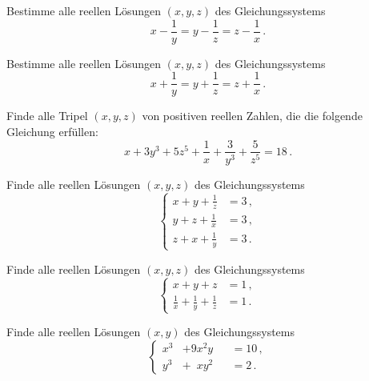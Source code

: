 \begin{aufgabe*}\label{aufgabe:520943}
	Bestimme alle reellen Lösungen $(x,y,z)$ des Gleichungssystems
	\begin{equation*}
		x-\frac 1y=y-\frac 1z=z-\frac 1x\,.
	\end{equation*}
\end{aufgabe*}
\begin{aufgabe*}\label{aufgabe:521043}
	Bestimme alle reellen Lösungen $(x,y,z)$ des Gleichungssystems
	\begin{equation*}
		x+\frac 1y=y+\frac 1z=z+\frac 1x\,.
	\end{equation*}
\end{aufgabe*}
\begin{aufgabe*}\label{aufgabe:380943}
	Finde alle Tripel $(x,y,z)$ von positiven reellen Zahlen, die die folgende Gleichung erfüllen:
	\begin{equation*}
		x+3y^3+5z^5+\frac1x+\frac{3}{y^3}+\frac{5}{z^5}=18\,.
	\end{equation*}
\end{aufgabe*}
\begin{aufgabe*}\label{aufgabe:451046}
	Finde alle reellen Lösungen $(x,y,z)$ des Gleichungssystems
	\begin{equation*}
		\left\{\begin{aligned}
			x+y+\frac 1z &= 3\,,\\
			y+z+\frac 1x &= 3\,,\\
			z+x+\frac 1y &= 3\,.
		\end{aligned}\right.
	\end{equation*}
\end{aufgabe*}
\begin{aufgabe*}\label{aufgabe:461041}
	Finde alle reellen Lösungen $(x,y,z)$ des Gleichungssystems
	\begin{equation*}
		\left\{\begin{aligned}
			x+y+z &= 1\,,\\
			\frac 1x+\frac 1y+\frac 1z &= 1\,.
		\end{aligned}\right.
	\end{equation*}
\end{aufgabe*}
\begin{aufgabe*}\label{aufgabe:541241}
	Finde alle reellen Lösungen $(x,y)$ des Gleichungssystems
	\begin{equation*}
		\left\{\begin{alignedat}{2}
			x^3&+9x^2y &&= 10\,,\\
			y^3&+\phantom{9}xy^2 &&= 2\,.
		\end{alignedat}\right.
	\end{equation*}
\end{aufgabe*}
